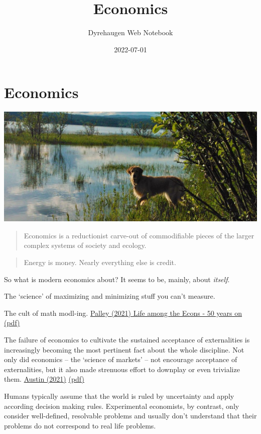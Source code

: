 \documentclass[
]{book}
\title{Economics}
\author{Dyrehaugen Web Notebook}
\date{2022-07-01}
\begin{document}
\maketitle

{
\setcounter{tocdepth}{1}
\tableofcontents
}
\hypertarget{economics}{%
\chapter{Economics}\label{economics}}

\includegraphics{fig/zelda.jpg}

\begin{quote}
Economics is a reductionist carve-out of commodifiable pieces of the larger complex systems of society and ecology.
\end{quote}

\begin{quote}
Energy is money. Nearly everything else is credit.
\end{quote}

So what is modern economics about? It seems to be, mainly, about \emph{itself}.

The `science' of maximizing and minimizing stuff you can't measure.

The cult of math modl-ing.
\href{pdf/Thomas_Palley_2106_Life_among_the_Econ_50yrs.pdf}{Palley (2021) Life among the Econs - 50 years on (pdf)}

The failure of economics to cultivate the sustained acceptance of externalities is increasingly
becoming the most pertinent fact about the whole discipline. Not only did economics -- the `science
of markets' -- not encourage acceptance of externalities, but it also made strenuous effort to
downplay or even trivialize them.
\href{https://bothbrainsrequire\%20d.com/2021/10/25/fix-that-fails/}{Austin (2021)}
\href{pdf/Austin_2021_Market_Led_Sustainability_Fix_Fails.pdf}{(pdf)}

Humans typically assume that the world is ruled by uncertainty and apply according decision making rules. Experimental economists, by contrast, only consider well-defined, resolvable problems and usually don't understand that their problems do not correspond to real life problems.
\end{document}
